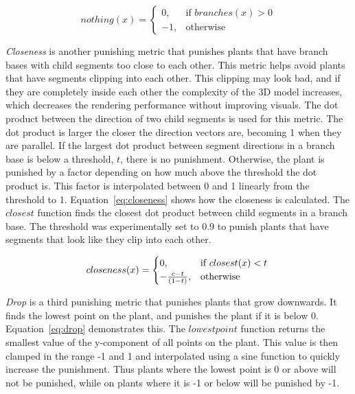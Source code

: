 \begin{equation}
\label{eq:nothing}
    nothing(x) =
    \begin{cases}
        0,& \text{if } branches(x) > 0  \\
        -1,& \text{otherwise}
    \end{cases}
\end{equation}

\textit{Closeness} is another punishing metric that punishes plants that have branch bases with child segments too close to each other.
This metric helps avoid plants that have segments clipping into each other.
This clipping may look bad, and if they are completely inside each other the complexity of the 3D model increases, which decreases the rendering performance without improving visuals.
The dot product between the direction of two child segments is used for this metric.
The dot product is larger the closer the direction vectors are, becoming 1 when they are parallel.
If the largest dot product between segment directions in a branch base is below a threshold, $t$, there is no punishment.
Otherwise, the plant is punished by a factor depending on how much above the threshold the dot product is.
This factor is interpolated between 0 and 1 linearly from the threshold to 1.
Equation~\ref{eq:closeness} shows how the closeness is calculated.
The $closest$ function finds the closest dot product between child segments in a branch base.
The threshold was experimentally set to 0.9 to punish plants that have segments that look like they clip into each other.

\begin{equation}
\label{eq:closeness}
    closeness(x) =
    \begin{cases}
        0,& \text{if } closest(x) < t \\
        -\frac{c - t}{(1 - t)},& \text{otherwise}
    \end{cases} \\
\end{equation}

\textit{Drop} is a third punishing metric that punishes plants that grow downwards.
It finds the lowest point on the plant, and punishes the plant if it is below 0.
Equation~\ref{eq:drop} demonstrates this.
The $lowestpoint$ function returns the smallest value of the y-component of all points on the plant.
This value is then clamped in the range -1 and 1 and interpolated using a sine function to quickly increase the punishment.
Thus plants where the lowest point is 0 or above will not be punished, while on plants where it is -1 or below will be punished by -1.

